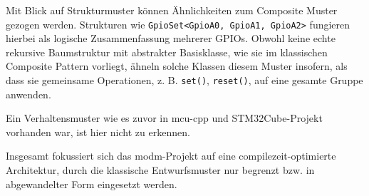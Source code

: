 Mit Blick auf Strukturmuster können Ähnlichkeiten zum Composite Muster gezogen werden.
Strukturen wie \texttt{GpioSet<GpioA0, GpioA1, GpioA2>} fungieren hierbei als logische Zusammenfassung mehrerer GPIOs.
Obwohl keine echte rekursive Baumstruktur mit abstrakter Basisklasse, wie sie im klassischen Composite Pattern vorliegt, ähneln solche Klassen diesem Muster insofern, als dass sie gemeinsame Operationen, z. B. \texttt{set()}, \texttt{reset()}, auf eine gesamte Gruppe anwenden. 

Ein Verhaltensmuster wie es zuvor in mcu-cpp und STM32Cube-Projekt vorhanden war, ist hier nicht zu erkennen.

Insgesamt fokussiert sich das modm-Projekt auf eine compilezeit-optimierte Architektur, durch die klassische Entwurfsmuster nur begrenzt bzw. in abgewandelter Form eingesetzt werden.




















































